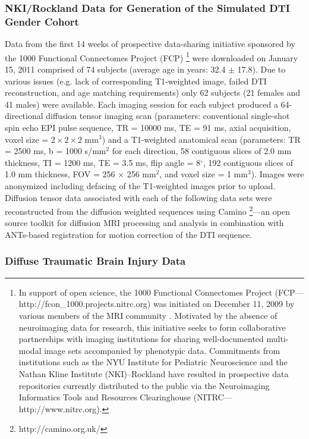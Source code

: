 \documentclass[final,5p,times,twocolumn]{elsarticle}
\begin{document}
\subsubsection{NKI/Rockland Data for Generation of the Simulated DTI Gender Cohort}
Data from the first 14 weeks of prospective data-sharing initiative sponsored by the 1000 Functional Connectomes Project (FCP)%
\footnote{
In support of open science, the 1000 Functional Connectomes Project (FCP---http://fcon\_1000.projects.nitrc.org) 
was initiated on December 11, 2009 by various members of the MRI community \citep{Biswal2010}.  Motivated by the absence of neuroimaging data for research, this initiative seeks to form collaborative partnerships with imaging institutions for sharing well-documented multi-modal image sets accompanied by phenotypic data.  Commitments from institutions such as the NYU Institute for Pediatric Neuroscience and the Nathan Kline Institute (NKI)--Rockland have resulted in prospective data repositories
currently distributed to the public via the Neuroimaging Informatics Tools and Resources Clearinghouse (NITRC---http://www.nitrc.org).
}
were downloaded on January 15, 2011 comprised of 74 subjects (average age in years: 32.4 $\pm$ 17.8).  
Due to various issues (e.g. lack of corresponding T1-weighted image,
failed DTI reconstruction, and age matching requirements) only 62
subjects (21 females and 41 males) were available.  Each imaging session for each subject produced a 64-directional diffusion tensor imaging scan (parameters: conventional single-shot spin echo
EPI pulse sequence, TR = 10000 ms, TE = 91 ms, axial acquisition, 
voxel size = $2 \times 2 \times 2$ mm$^3$) and a T1-weighted anatomical scan (parameters:  TR = 2500 ms, b = 1000 s/mm$^2$ for each direction, 58 contiguous slices of 2.0 mm thickness,
TI = 1200 ms, TE = 3.5 ms, flip angle = 8$^\circ$, 192 contiguous slices of 
1.0 mm thickness, FOV = 256 $\times$ 256 mm$^2$, and voxel size = 1 mm$^3$).  Images were anonymized including defacing of the T1-weighted images prior to upload. Diffusion tensor data associated with each of the following data sets were reconstructed from the diffusion weighted sequences using Camino%
\footnote{
http://camino.org.uk/
}---an open source toolkit for diffusion MRI processing and 
analysis \citep{Cook2006} in combination with ANTs-based 
registration for motion correction of the DTI sequence.


\subsubsection{Diffuse Traumatic Brain Injury Data}
\end{document}
